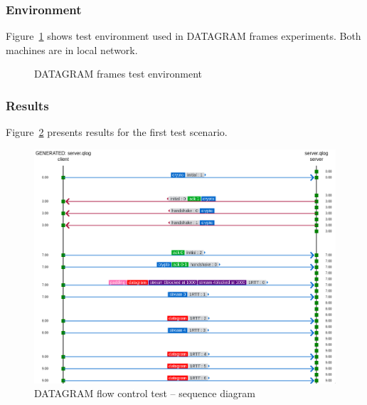 \subsubsection{Environment}
\label{subsubsec:test-env}
Figure~\ref{fig:dgram-test-env} shows test environment used in DATAGRAM frames experiments.
Both machines are in local network.

\begin{figure}[h]
    \centering
    \caption{DATAGRAM frames test environment}
    \label{fig:dgram-test-env}
\end{figure}

\subsubsection{Results}
Figure~\ref{fig:dgram_flow_control} presents results for the first test scenario.

\begin{figure}
    \centering
    \includegraphics[width=\textwidth]{img/__09__datagrams/dgram_flow_control.png}
    \caption{DATAGRAM flow control test -- sequence diagram}
    \label{fig:dgram_flow_control}
\end{figure}

